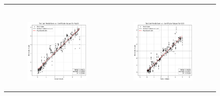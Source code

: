 \begin{figure}
{\begin{tabular}{cc}
\begin{subfigure}{0.5\textwidth}
            \end{subfigure} \\
            \begin{subfigure}{0.5\textwidth}
                \includegraphics[width=\textwidth]{images/one_to_one/enetalpha01/Na2O.png}
            \end{subfigure} & \hspace{3cm}
            \begin{subfigure}{0.5\textwidth}
                \includegraphics[width=\textwidth]{images/one_to_one/enetalpha01/K2O.png}

\end{subfigure}
\end{tabular}}
\end{figure}

